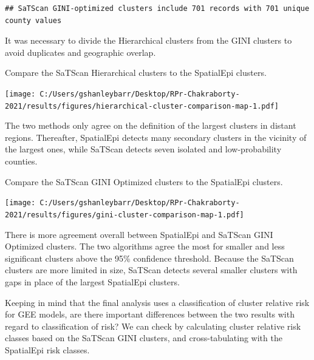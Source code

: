 \documentclass[
]{article}
\begin{document}
\begin{verbatim}
## SaTScan GINI-optimized clusters include 701 records with 701 unique county values
\end{verbatim}

It was necessary to divide the Hierarchical clusters from the GINI
clusters to avoid duplicates and geographic overlap.

Compare the SaTScan Hierarchical clusters to the SpatialEpi clusters.

\texttt{[image: C:/Users/gshanleybarr/Desktop/RPr-Chakraborty-2021/results/figures/hierarchical-cluster-comparison-map-1.pdf]}

The two methods only agree on the definition of the largest clusters in
distant regions. Thereafter, SpatialEpi detects many secondary clusters
in the vicinity of the largest ones, while SaTScan detects seven
isolated and low-probability counties.

Compare the SaTScan GINI Optimized clusters to the SpatialEpi clusters.

\texttt{[image: C:/Users/gshanleybarr/Desktop/RPr-Chakraborty-2021/results/figures/gini-cluster-comparison-map-1.pdf]}

There is more agreement overall between SpatialEpi and SaTScan GINI
Optimized clusters. The two algorithms agree the most for smaller and
less significant clusters above the 95\% confidence threshold. Because
the SaTScan clusters are more limited in size, SaTScan detects several
smaller clusters with gaps in place of the largest SpatialEpi clusters.

Keeping in mind that the final analysis uses a classification of cluster
relative risk for GEE models, are there important differences between
the two results with regard to classification of risk? We can check by
calculating cluster relative risk classes based on the SaTScan GINI
clusters, and cross-tabulating with the SpatialEpi risk classes.
\end{document}
